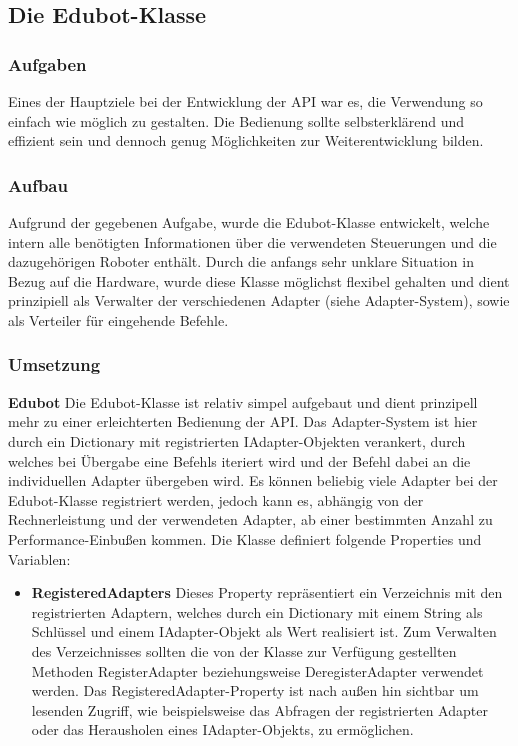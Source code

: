 
\subsection{Die Edubot-Klasse}

\subsubsection{Aufgaben}
Eines der Hauptziele bei der Entwicklung der API war es, die Verwendung so einfach wie möglich zu gestalten. Die Bedienung sollte selbsterklärend und effizient sein und dennoch genug Möglichkeiten zur Weiterentwicklung bilden.

\subsubsection{Aufbau}
Aufgrund der gegebenen Aufgabe, wurde die Edubot-Klasse entwickelt, welche intern alle benötigten Informationen über die verwendeten Steuerungen und die dazugehörigen Roboter enthält. Durch die anfangs sehr unklare Situation in Bezug auf die Hardware, wurde diese Klasse möglichst flexibel gehalten und dient prinzipiell als Verwalter der verschiedenen Adapter (siehe Adapter-System), sowie als Verteiler für eingehende Befehle.

\subsubsection{Umsetzung}
\textbf{Edubot}
\newline
Die Edubot-Klasse ist relativ simpel aufgebaut und dient prinzipell mehr zu einer erleichterten Bedienung der API. Das Adapter-System ist hier durch ein Dictionary mit registrierten IAdapter-Objekten verankert, durch welches bei Übergabe eine Befehls iteriert wird und der Befehl dabei an die individuellen Adapter übergeben wird. Es können beliebig viele Adapter bei der Edubot-Klasse registriert werden, jedoch kann es, abhängig von der Rechnerleistung und der verwendeten Adapter, ab einer bestimmten Anzahl zu Performance-Einbußen kommen.
Die Klasse definiert folgende Properties und Variablen:
\begin{itemize}
\item \textbf{RegisteredAdapters}
\newline
Dieses Property repräsentiert ein Verzeichnis mit den registrierten Adaptern, welches durch ein Dictionary mit einem String als Schlüssel und einem IAdapter-Objekt als Wert realisiert ist. Zum Verwalten des Verzeichnisses sollten die von der Klasse zur Verfügung gestellten Methoden RegisterAdapter beziehungsweise DeregisterAdapter verwendet werden. Das RegisteredAdapter-Property ist nach außen hin sichtbar um lesenden Zugriff, wie beispielsweise das Abfragen der registrierten Adapter oder das Herausholen eines IAdapter-Objekts, zu ermöglichen. 
\end{itemize}


